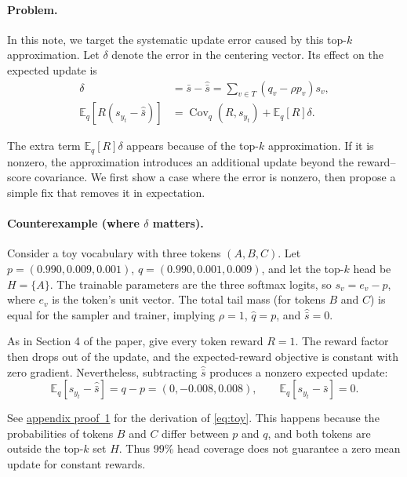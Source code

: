 \documentclass[10pt]{article}
\newcommand{\E}{\mathbb{E}}
\newcommand{\Cov}{\operatorname{Cov}}
\begin{document}
\paragraph{Problem.}
In this note, we target the systematic update error caused by this top-$k$ approximation. Let $\delta$ denote the error in the centering vector. Its effect on the expected update is
\begin{equation}\label{eq:drift}
\begin{aligned}
 \delta&=\bar s-\widehat{\bar s}=\sum_{v\in T}(q_v-\rho p_v)s_v,\\
 \E_q[R(s_{y_t}-\widehat{\bar s})]
 &=\Cov_q(R,s_{y_t})+\E_q[R]\delta.
\end{aligned}
\end{equation}

The extra term $\E_q[R]\delta$ appears because of the top-$k$ approximation. If it is nonzero, the approximation introduces an additional update beyond the reward--score covariance. We first show a case where the error is nonzero, then propose a simple fix that removes it in expectation.


\paragraph{Counterexample (where $\delta$ matters).}
Consider a toy vocabulary with three tokens $(A,B,C)$. Let $p=(0.990,0.009,0.001)$, $q=(0.990,0.001,0.009)$, and let the top-$k$ head be $H=\{A\}$. The trainable parameters are the three softmax logits, so $s_v=e_v-p$, where $e_v$ is the token's unit vector. The total tail mass (for tokens $B$ and $C$) is equal for the sampler and trainer, implying $\rho=1$, $\widehat q=p$, and $\widehat{\bar s}=0$.

As in Section 4 of the paper, give every token reward $R=1$. The reward factor then drops out of the update, and the expected-reward objective is constant with zero gradient. Nevertheless, subtracting $\widehat{\bar s}$ produces a nonzero expected update:
\begin{equation}\label{eq:toy}
 \E_q[s_{y_t}-\widehat{\bar s}]=q-p=(0,-0.008,0.008),
 \qquad \E_q[s_{y_t}-\bar s]=0.
\end{equation}

See \hyperref[app:toy]{appendix proof~1} for the derivation of \eqref{eq:toy}. This happens because the probabilities of tokens $B$ and $C$ differ between $p$ and $q$, and both tokens are outside the top-$k$ set $H$. Thus 99\% head coverage does not guarantee a zero mean update for constant rewards.
\end{document}
